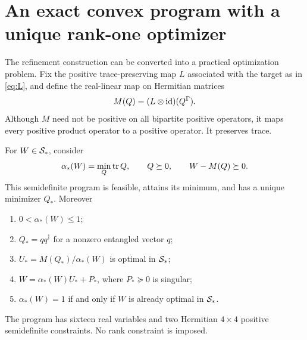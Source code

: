 \section{An exact convex program with a unique rank-one optimizer}

The refinement construction can be converted into a practical optimization problem. Fix the positive trace-preserving map $L$ associated with the target as in \eqref{eq:L}, and define the real-linear map on Hermitian matrices
\[
 M(Q)=(L\otimes\operatorname{id})(Q^\Gamma).
\]
Although $M$ need not be positive on all bipartite positive operators, it maps every positive product operator to a positive operator. It preserves trace.

\begin{theorem}\label{thm:sdp}
For $W\in\mathcal S_*$, consider
\begin{equation}\label{eq:sdp-primal}
 \alpha_*(W)=\min_Q\operatorname{tr} Q,
 \qquad Q\succeq0,\qquad W-M(Q)\succeq0.
\end{equation}
This semidefinite program is feasible, attains its minimum, and has a unique minimizer $Q_*$. Moreover
\begin{enumerate}[label=(\roman*)]
\item $0<\alpha_*(W)\leq1$;
\item $Q_*=qq^\dagger$ for a nonzero entangled vector $q$;
\item $U_*=M(Q_*)/\alpha_*(W)$ is optimal in $\mathcal S_*$;
\item $W=\alpha_*(W)U_*+P_*$, where $P_*\succeq0$ is singular;
\item $\alpha_*(W)=1$ if and only if $W$ is already optimal in $\mathcal S_*$.
\end{enumerate}
The program has sixteen real variables and two Hermitian $4\times4$ positive semidefinite constraints. No rank constraint is imposed.
\end{theorem}
